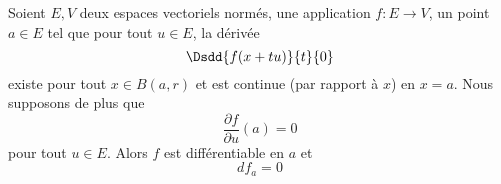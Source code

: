 \begin{theorem} \label{ThoOYwdeVt}
    Soient \( E,V\) deux espaces vectoriels normés, une application \( f\colon E\to V\), un point \( a\in E\) tel que pour tout \( u\in E\), la dérivée
    \begin{equation}
        \Dsdd{ f(x+tu) }{t}{0}
    \end{equation}
    existe pour tout \( x\in B(a,r)\) et est continue (par rapport à \( x\)) en \( x=a\). Nous supposons de plus que
    \begin{equation}
        \frac{ \partial f }{ \partial u }(a)=0
    \end{equation}
    pour tout \( u\in E\). Alors \( f\) est différentiable en \( a\) et
    \begin{equation}
        df_a=0
    \end{equation}
\end{theorem}

